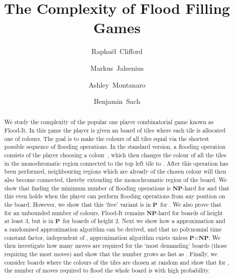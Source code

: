 \documentclass[a4paper,11pt]{llncs}
\title{The Complexity of Flood Filling Games}
\author{Rapha\"{e}l~Clifford \and  Markus~Jalsenius \and Ashley~Montanaro \and Benjamin~Sach}
\institute{Department of Computer Science, University of Bristol, UK}
\newcounter{l}
\newcommand{\Ptime}{\ensuremath{\mathbf{P}}}
\newcommand{\NPtime}{\ensuremath{\mathbf{NP}}}
\newcommand{\recdim}[2]{}
\begin{document}
\maketitle

\begin{abstract}
We study the complexity of the popular one player combinatorial game known as Flood-It. In this game the player is given an \recdim{n}{n} board of tiles where each tile is allocated one of  colours. The goal is to make the colours of all tiles equal via the shortest possible sequence of flooding operations. In the standard version, a flooding operation consists of the player choosing a colour~, which then changes the colour of all the tiles in the monochromatic region connected to the top left tile to . After this operation has been performed, neighbouring regions which are already of the chosen colour  will then also become connected, thereby extending the monochromatic region of the board. We show that finding the minimum number of flooding operations is \NPtime-hard for  and that this even holds when the player can perform flooding operations from any position on the board. However, we show that this `free' variant is in \Ptime\ for . We also prove that for an unbounded number of colours, Flood-It remains \NPtime-hard for boards of height at least 3, but is in \Ptime\ for boards of height 2. Next we show how a  approximation and a randomised  approximation algorithm can be derived, and that no polynomial time constant factor, independent of , approximation algorithm exists unless \Ptime=\NPtime.  We then investigate how many moves are required for the `most demanding' \recdim{n}{n} boards (those requiring the most moves) and show that the number grows as fast as .    Finally, we consider boards where the colours of the tiles are chosen at random and show that for , the number of moves required to flood the whole board is  with high probability.
\end{abstract}
\end{document}
